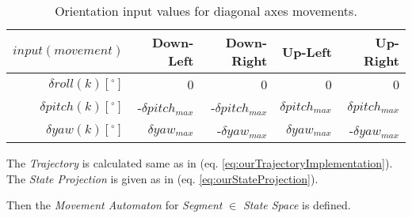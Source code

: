 \begin{table}[H]
    \centering
    \begin{tabular}{r||r|r|r|r}
        $input(movement)$             & Down-Left & Down-Right & Up-Left  & Up-Right   \\\hline\hline

        $\delta  roll(k) [^\circ]$	& 0	    & 0	    & 0    & 0     \\\hline
        $\delta pitch(k) [^\circ]$     & -$\delta pitch_{max}$ & -$\delta pitch_{max}$ & $\delta pitch_{max}$ & $\delta pitch_{max}$     \\\hline
        $\delta   yaw(k) [^\circ]$    & $\delta yaw_{max}$	& -$\delta yaw_{max}$	& $\delta yaw_{max}$ & -$\delta yaw_{max}$ \\
    \end{tabular}
    \caption{Orientation input values for diagonal axes movements.}
    \label{tab:movements4}
\end{table}

\begin{note}
    The \emph{Trajectory} is calculated same as in (eq. \ref{eq:ourTrajectoryImplementation}). The \emph{State Projection} is given as in (eq. \ref{eq:ourStateProjection}).
\end{note}

\noindent Then the \emph{Movement Automaton} for \emph{Segment} $\in$ \emph{State Space} is defined.

